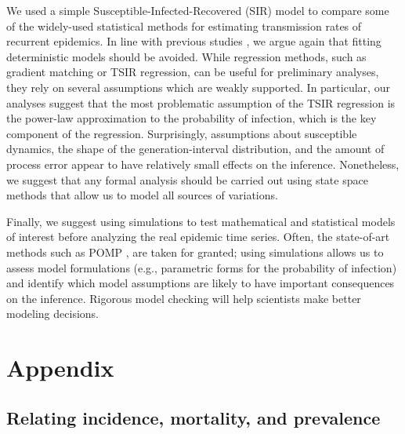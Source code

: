 \documentclass{article}
\begin{document}
We used a simple Susceptible-Infected-Recovered (SIR) model to compare some of the widely-used statistical methods for estimating transmission rates of recurrent epidemics.
In line with previous studies \citep{king2015avoidable, taylor2016stochasticity}, we argue again that fitting deterministic models should be avoided.
While regression methods, such as gradient matching or TSIR regression, can be useful for preliminary analyses, 
they rely on several assumptions which are weakly supported.
In particular, our analyses suggest that the most problematic assumption of the TSIR regression is the power-law approximation to the probability of infection, which is the key component of the regression.
Surprisingly, assumptions about susceptible dynamics, the shape of the generation-interval distribution, and the amount of process error appear to have relatively small effects on the inference.
Nonetheless, we suggest that any formal analysis should be carried out using state space methods that allow us to model all sources of variations.

Finally, we suggest using simulations to test mathematical and statistical models of interest before analyzing the real epidemic time series.
Often, the state-of-art methods such as POMP \citep{king2015statistical}, are taken for granted;
using simulations allows us to assess model formulations (e.g., parametric forms for the probability of infection) and identify which model assumptions are likely to have important consequences on the inference.
Rigorous model checking will help scientists make better modeling decisions.

\pagebreak

{} 


\pagebreak

\appendix
\renewcommand{\thesection}{\Alph{section}}
\renewcommand{\thesubsection}{A.\arabic{subsection}}
\renewcommand\thefigure{A.\arabic{subsection}}    
\section{Appendix}

\subsection{Relating incidence, mortality, and prevalence}
\end{document}

